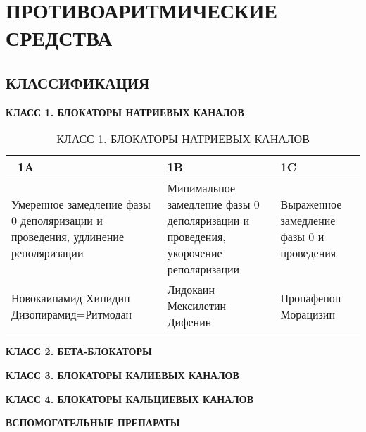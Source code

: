 \documentclass[twoside,final,12pt]{extreport}
\begin{document}
\chapter {ПРОТИВОАРИТМИЧЕСКИЕ СРЕДСТВА}
\section {КЛАССИФИКАЦИЯ}
{\bfseries КЛАСС 1. БЛОКАТОРЫ НАТРИЕВЫХ КАНАЛОВ}
\begin{table}[t]
\begin{tabular}{|p{}|p{}|p{}|}
	\hline \ 1A & 1B & 1C \\ \hline
	Умеренное замедление фазы 0 деполяризации и проведения, удлинение реполяризации &
	Минимальное замедление фазы 0 деполяризации и проведения, укорочение реполяризации &
	Выраженное замедление фазы 0 и проведения \\ \hline
	Новокаинамид
	Хинидин
	Дизопирамид=Ритмодан &
	Лидокаин 
	Мексилетин 
	Дифенин &
	Пропафенон
	Морацизин \\ \hline
\end{tabular}
\caption{КЛАСС 1. БЛОКАТОРЫ НАТРИЕВЫХ КАНАЛОВ}
\label{Na-block}
\end{table}


{\bfseries КЛАСС 2. БЕТА-БЛОКАТОРЫ}


{\bfseries КЛАСС 3. БЛОКАТОРЫ КАЛИЕВЫХ КАНАЛОВ}


{\bfseries КЛАСС 4. БЛОКАТОРЫ КАЛЬЦИЕВЫХ КАНАЛОВ}


{\bfseries ВСПОМОГАТЕЛЬНЫЕ ПРЕПАРАТЫ}
\end{document}
